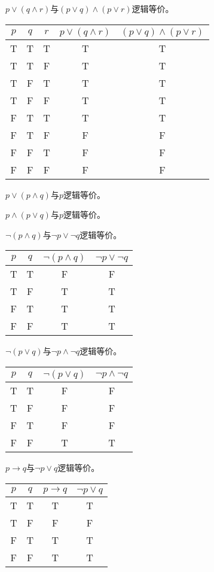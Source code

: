 \documentclass{article}
\begin{document}
\begin{CJK}{UTF8}{gbsn}
  

  $p\lor (q\land r)$与$(p\lor q)\land (p \lor r)$逻辑等价。

      \begin{tabular}{ccc|cc}
    $p$& $q$& $r$&$p\lor (q\land r)$ &$(p\lor q)\land (p \lor r)$\\
    \hline
    T&T&T&T&T\\
    T&T&F&T&T\\
    T&F&T&T&T\\
     T& F&F&T&T\\
    F&T&T&T&T\\
    F&T&F&F&F\\
    F&F&T&F&F\\
     F&F&F&F&F\\
  \end{tabular}

  $p \lor (p\land q)$与$p$逻辑等价。 

  $p \land (p\lor q)$与$p$逻辑等价。

  $\lnot (p\land q)$与$\lnot p \lor \lnot q$逻辑等价。

      \begin{tabular}{cc|cc}
    $p$& $q$&$\lnot (p\land q)$ &$\lnot p \lor \lnot q$\\
    \hline
    T&T&F&F\\
    T&F&T&T\\
    F&T&T&T\\
      F&F&T&T\\      
  \end{tabular}

   

  $\lnot (p \lor q)$与$\lnot p \land \lnot q$逻辑等价。
  
      \begin{tabular}{cc|cc}
    $p$& $q$&$\lnot (p \lor q)$&$\lnot p \land \lnot q$\\
    \hline
    T&T&F&F\\
    T&F&F&F\\
    F&T&F&F\\
    F&F&T&T\\      
  \end{tabular}

  $p \to q$与$\lnot p \lor q$逻辑等价。
  
      \begin{tabular}{cc|cc}
    $p$& $q$&$p \to q$&$\lnot p \lor q$\\
    \hline
    T&T&T&T\\
    T&F&F&F\\
    F&T&T&T\\
    F&F&T&T\\      
  \end{tabular}
  

\end{CJK}
\end{document}
